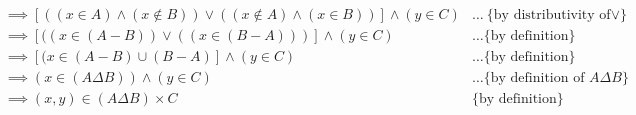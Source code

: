 \documentclass[12pt]{scrartcl}
\begin{document}
\begin{enumerate}
\begin{align*}
        \\ & \implies [((x \in A) \land (x \notin B)) \lor ((x \notin A) \land (x \in B))] \land (y \in C) & \ldots \text{\{by distributivity of $\lor$\}}.    
        \\ & \implies [((x \in (A - B) ) \lor ((x \in (B- A)))] \land (y \in C) & \ldots \text{\{by definition\}}
        \\ & \implies [(x \in (A - B) \cup (B - A)] \land (y \in C) & \ldots \text{\{by definition\}}
        \\ & \implies (x \in (A \Delta B)) \land (y \in C) & \ldots \text{\{by definition of $A  \Delta B$\}}
        \\ & \implies (x,y) \in (A \Delta B) \times C & \text{\{by definition\}}
    \end{align*}
\end{enumerate}
\end{document}
